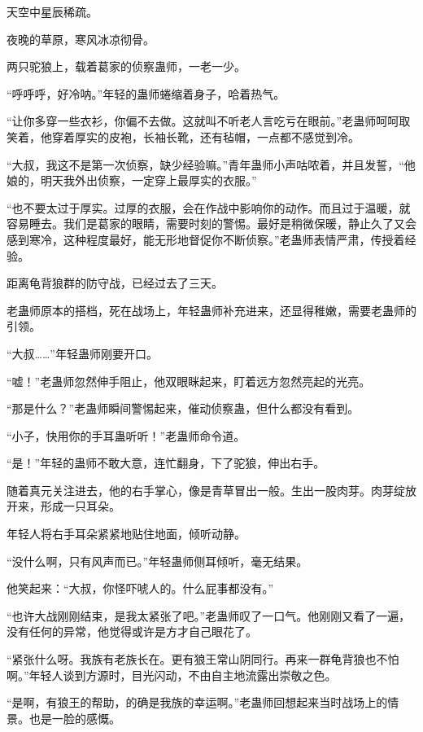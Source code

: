 
\begin{this_body}

天空中星辰稀疏。

夜晚的草原，寒风冰凉彻骨。

两只驼狼上，载着葛家的侦察蛊师，一老一少。

“呼呼呼，好冷呐。”年轻的蛊师蜷缩着身子，哈着热气。

“让你多穿一些衣衫，你偏不去做。这就叫不听老人言吃亏在眼前。”老蛊师呵呵取笑着，他穿着厚实的皮袍，长袖长靴，还有毡帽，一点都不感觉到冷。

“大叔，我这不是第一次侦察，缺少经验嘛。”青年蛊师小声咕哝着，并且发誓，“他娘的，明天我外出侦察，一定穿上最厚实的衣服。”

“也不要太过于厚实。过厚的衣服，会在作战中影响你的动作。而且过于温暖，就容易睡去。我们是葛家的眼睛，需要时刻的警惕。最好是稍微保暖，静止久了又会感到寒冷，这种程度最好，能无形地督促你不断侦察。”老蛊师表情严肃，传授着经验。

距离龟背狼群的防守战，已经过去了三天。

老蛊师原本的搭档，死在战场上，年轻蛊师补充进来，还显得稚嫩，需要老蛊师的引领。

“大叔……”年轻蛊师刚要开口。

“嘘！”老蛊师忽然伸手阻止，他双眼眯起来，盯着远方忽然亮起的光亮。

“那是什么？”老蛊师瞬间警惕起来，催动侦察蛊，但什么都没有看到。

“小子，快用你的手耳蛊听听！”老蛊师命令道。

“是！”年轻的蛊师不敢大意，连忙翻身，下了驼狼，伸出右手。

随着真元关注进去，他的右手掌心，像是青草冒出一般。生出一股肉芽。肉芽绽放开来，形成一只耳朵。

年轻人将右手耳朵紧紧地贴住地面，倾听动静。

“没什么啊，只有风声而已。”年轻蛊师侧耳倾听，毫无结果。

他笑起来：“大叔，你怪吓唬人的。什么屁事都没有。”

“也许大战刚刚结束，是我太紧张了吧。”老蛊师叹了一口气。他刚刚又看了一遍，没有任何的异常，他觉得或许是方才自己眼花了。

“紧张什么呀。我族有老族长在。更有狼王常山阴同行。再来一群龟背狼也不怕啊。”年轻人谈到方源时，目光闪动，不由自主地流露出崇敬之色。

“是啊，有狼王的帮助，的确是我族的幸运啊。”老蛊师回想起来当时战场上的情景。也是一脸的感慨。


\end{this_body}
